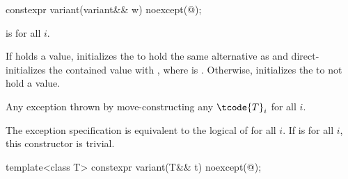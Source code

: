 %
\begin{itemdecl}
constexpr variant(variant&& w) noexcept(@\seebelow@);
\end{itemdecl}

\begin{itemdescr}
\pnum
\constraints
{} is  for all $i$.

\pnum
\effects
If  holds a value, initializes the  to hold the same
alternative as  and direct-initializes the contained value with
, where  is .
Otherwise, initializes the  to not hold a value.

\pnum
\throws
Any exception thrown by move-constructing any $\tcode{T}_i$ for all $i$.

\pnum
\remarks
The exception specification is equivalent to the logical  of
 for all $i$.
If 
is  for all $i$, this constructor is trivial.
\end{itemdescr}

%
\begin{itemdecl}
template<class T> constexpr variant(T&& t) noexcept(@\seebelow@);
\end{itemdecl}

